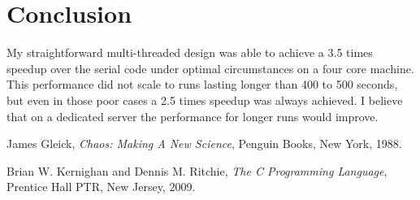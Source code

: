\documentclass{article}
\begin{document}
\section{Conclusion}
My straightforward multi-threaded design was able to achieve a 3.5 times speedup over the serial code under optimal circumstances on a four core machine. This performance did not scale to runs lasting longer than 400 to 500 seconds, but even in those poor cases a 2.5 times speedup was always achieved. I believe that on a dedicated server the performance for longer runs would improve. 

\begin{thebibliography}{9}

  James Gleick,
  \emph{Chaos: Making A New Science},
  Penguin Books, New York,
  1988.

  Brian W. Kernighan and Dennis M. Ritchie,
  \emph{The C Programming Language},
  Prentice Hall PTR, New Jersey,
  2009.

\end{thebibliography}
\end{document}
